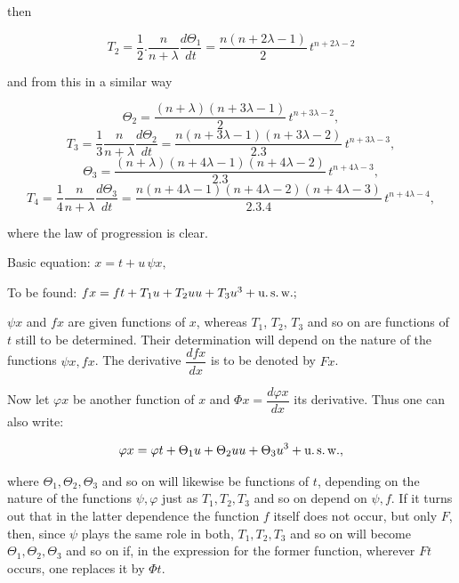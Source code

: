 %

\noindent then

\[ T_2 = \frac{1}{2}\mathord{.}\frac{n}{n+\lambda}\frac{d\Theta_1}{dt} = \frac{n(n+2\lambda-1)}{2}\, t^{n+2\lambda-2} \]

\noindent and from this in a similar way

\[ \Theta_2 = \frac{(n+\lambda)(n+3\lambda-1)}{2}\, t^{n+3\lambda-2}, \]
\[ T_3 = \frac{1}{3}\frac{n}{n+\lambda}\frac{d\Theta_2}{dt} = \frac{n(n+3\lambda-1)(n+3\lambda-2)}{2.3}\, t^{n+3\lambda-3}, \]
\[ \Theta_3 = \frac{(n+\lambda)(n+4\lambda-1)(n+4\lambda-2)}{2.3}\, t^{n+4\lambda-3}, \]
\[ T_4 = \frac{1}{4}\frac{n}{n+\lambda}\frac{d\Theta_3}{dt} = \frac{n(n+4\lambda-1)(n+4\lambda-2)(n+4\lambda-3)}{2.3.4}\, t^{n+4\lambda-4}, \]

\noindent where the law of progression is clear.

\begin{center}\end{center}

\noindent Basic equation: \quad $x = t + u\,\psi x,$

\noindent To be found: \quad $fx = ft + T_1 u + T_2 uu + T_3 u^3 + \text{u.\,s.\,w.};$

\noindent $\psi x$ and $fx$ are given functions of $x$, whereas $T_1$, $T_2$, $T_3$ and so on are functions of $t$ still to be determined. Their determination will depend on the nature of the functions $\psi x, fx$. The derivative $\dfrac{dfx}{dx}$ is to be denoted by $Fx$.

Now let $\varphi x$ be another function of $x$ and $\Phi x = \dfrac{d\varphi x}{dx}$ its derivative. Thus one can also write:

\[ \varphi x = \varphi t + \Theta_1 u + \Theta_2 uu + \Theta_3 u^3 + \text{u.\,s.\,w.}, \]

\noindent where $\Theta_1, \Theta_2, \Theta_3$ and so on will likewise be functions of $t$, depending on the nature of the functions $\psi, \varphi$ just as $T_1, T_2, T_3$ and so on depend on $\psi, f$. If it turns out that in the latter dependence the function $f$ itself does not occur, but only $F$, then, since $\psi$ plays the same role in both, $T_1, T_2, T_3$ and so on will become $\Theta_1, \Theta_2, \Theta_3$ and so on if, in the expression for the former function, wherever $Ft$ occurs, one replaces it by $\Phi t$.
